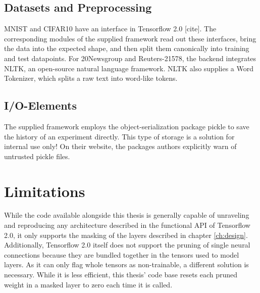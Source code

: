 \subsection{Datasets and Preprocessing}
MNIST and CIFAR10 have an interface in Tensorflow 2.0 [cite]. The corresponding modules of the supplied framework read out these interfaces, bring the data into the expected shape, and then split them canonically into training and test datapoints. 
For 20Newsgroup and Reuters-21578, the backend integrates NLTK, an open-source natural language framework. NLTK also supplies a Word Tokenizer, which splits a raw text into word-like tokens.
\subsection{I/O-Elements}
The supplied framework employs the object-serialization package pickle to save the history of an experiment directly. This type of storage is a solution for internal use only! On their website, the packages authors explicitly warn of untrusted pickle files.

\section{Limitations}
While the code available alongside this thesis is generally capable of unraveling and reproducing any architecture described in the functional API of Tensorflow 2.0, it only supports the masking of the layers described in chapter \ref{ch:design}. 
Additionally, Tensorflow 2.0 itself does not support the pruning of single neural connections because they are bundled together in the tensors used to model layers. As it can only flag whole tensors as non-trainable, a different solution is necessary. While it is less efficient, this thesis' code base resets each pruned weight in a masked layer to zero each time it is called.